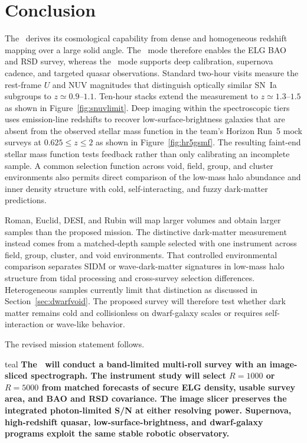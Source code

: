 \clearpage
\section{Conclusion}

The \facility\ derives its cosmological capability from dense and homogeneous redshift mapping over a large solid angle. The \fovlarge\ mode therefore enables the ELG BAO and RSD survey, whereas the \fovsmall\ mode supports deep calibration, supernova cadence, and targeted quasar observations. Standard two-hour visits measure the rest-frame $U$ and NUV magnitudes that distinguish optically similar SN~Ia subgroups to $z\simeq0.9$--$1.1$. Ten-hour stacks extend the measurement to $z\simeq1.3$--$1.5$ as shown in Figure~\ref{fig:snuvlimit}. Deep imaging within the spectroscopic tiers uses emission-line redshifts to recover low-surface-brightness galaxies that are absent from the observed stellar mass function in the team's Horizon Run~5 mock surveys at $0.625\le z\le2$ as shown in Figure~\ref{fig:hr5gsmf}. The resulting faint-end stellar mass function tests feedback rather than only calibrating an incomplete sample. A common selection function across void, field, group, and cluster environments also permits direct comparison of the low-mass halo abundance and inner density structure with cold, self-interacting, and fuzzy dark-matter predictions.

Roman, Euclid, DESI, and Rubin will map larger volumes and obtain larger samples than the proposed mission. The distinctive dark-matter measurement instead comes from a matched-depth sample selected with one instrument across field, group, cluster, and void environments. That controlled environmental comparison separates SIDM or wave-dark-matter signatures in low-mass halo structure from tidal processing and cross-survey selection differences. Heterogeneous samples currently limit that distinction as discussed in Section~\ref{sec:dwarfvoid}. The proposed survey will therefore test whether dark matter remains cold and collisionless on dwarf-galaxy scales or requires self-interaction or wave-like behavior.

The revised mission statement follows.
\begin{leadbox}[title=Mission Statement]{teal}
\textbf{The \facility\ will conduct a band-limited multi-roll survey with an image-sliced spectrograph. The instrument study will select $R=1000$ or $R=5000$ from matched forecasts of secure ELG density, usable survey area, and BAO and RSD covariance. The image slicer preserves the integrated photon-limited S/N at either resolving power. Supernova, high-redshift quasar, low-surface-brightness, and dwarf-galaxy programs exploit the same stable robotic observatory.}
\end{leadbox}

